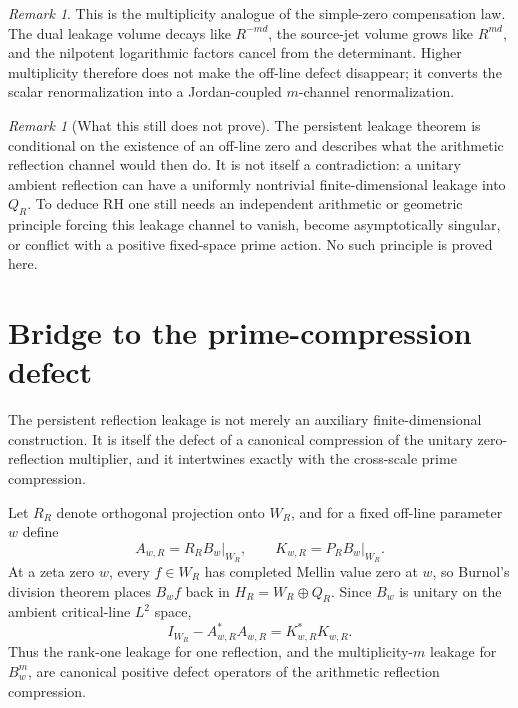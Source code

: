 \documentclass[11pt]{article}
\theoremstyle{remark}
\newtheorem{remark}[theorem]{Remark}
\begin{document}
\begin{remark}
This is the multiplicity analogue of the simple-zero compensation law.  The dual leakage volume decays like $R^{-md}$, the source-jet volume grows like $R^{md}$, and the nilpotent logarithmic factors cancel from the determinant.  Higher multiplicity therefore does not make the off-line defect disappear; it converts the scalar renormalization into a Jordan-coupled $m$-channel renormalization.
\end{remark}

\begin{remark}[What this still does not prove]
The persistent leakage theorem is conditional on the existence of an off-line zero and describes what the arithmetic reflection channel would then do.  It is not itself a contradiction: a unitary ambient reflection can have a uniformly nontrivial finite-dimensional leakage into $Q_R$.  To deduce RH one still needs an independent arithmetic or geometric principle forcing this leakage channel to vanish, become asymptotically singular, or conflict with a positive fixed-space prime action.  No such principle is proved here.
\end{remark}


\section{Bridge to the prime-compression defect}
The persistent reflection leakage is not merely an auxiliary finite-dimensional construction.  It is itself the defect of a canonical compression of the unitary zero-reflection multiplier, and it intertwines exactly with the cross-scale prime compression.

Let $R_R$ denote orthogonal projection onto $W_R$, and for a fixed off-line parameter $w$ define
\[
 A_{w,R}=R_RB_w\big|_{W_R},
 \qquad
 K_{w,R}=P_RB_w\big|_{W_R}.
\]
At a zeta zero $w$, every $f\in W_R$ has completed Mellin value zero at $w$, so Burnol's division theorem places $B_wf$ back in $H_R=W_R\oplus Q_R$.  Since $B_w$ is unitary on the ambient critical-line $L^2$ space,
\begin{equation}\label{eq:reflection-defect}
 \boxed{I_{W_R}-A_{w,R}^*A_{w,R}=K_{w,R}^*K_{w,R}.}
\end{equation}
Thus the rank-one leakage for one reflection, and the multiplicity-$m$ leakage for $B_w^m$, are canonical positive defect operators of the arithmetic reflection compression.
\end{document}
